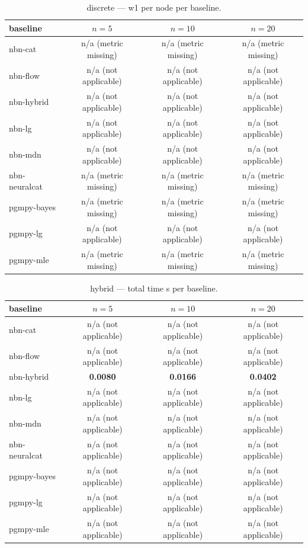 \begin{table}[h]
\centering
\caption{discrete — w1 per node per baseline.}
\label{tab:discrete_w1_per_node}
\begin{tabular}{lccc}
\toprule
baseline & $n=5$ & $n=10$ & $n=20$ \\
\midrule
nbn-cat & n/a (metric missing) & n/a (metric missing) & n/a (metric missing) \\
nbn-flow & n/a (not applicable) & n/a (not applicable) & n/a (not applicable) \\
nbn-hybrid & n/a (not applicable) & n/a (not applicable) & n/a (not applicable) \\
nbn-lg & n/a (not applicable) & n/a (not applicable) & n/a (not applicable) \\
nbn-mdn & n/a (not applicable) & n/a (not applicable) & n/a (not applicable) \\
nbn-neuralcat & n/a (metric missing) & n/a (metric missing) & n/a (metric missing) \\
pgmpy-bayes & n/a (metric missing) & n/a (metric missing) & n/a (metric missing) \\
pgmpy-lg & n/a (not applicable) & n/a (not applicable) & n/a (not applicable) \\
pgmpy-mle & n/a (metric missing) & n/a (metric missing) & n/a (metric missing) \\
\bottomrule
\end{tabular}
\end{table}

\begin{table}[h]
\centering
\caption{hybrid — total time s per baseline.}
\label{tab:hybrid_total_time_s}
\begin{tabular}{lccc}
\toprule
baseline & $n=5$ & $n=10$ & $n=20$ \\
\midrule
nbn-cat & n/a (not applicable) & n/a (not applicable) & n/a (not applicable) \\
nbn-flow & n/a (not applicable) & n/a (not applicable) & n/a (not applicable) \\
nbn-hybrid & \textbf{0.0080} & \textbf{0.0166} & \textbf{0.0402} \\
nbn-lg & n/a (not applicable) & n/a (not applicable) & n/a (not applicable) \\
nbn-mdn & n/a (not applicable) & n/a (not applicable) & n/a (not applicable) \\
nbn-neuralcat & n/a (not applicable) & n/a (not applicable) & n/a (not applicable) \\
pgmpy-bayes & n/a (not applicable) & n/a (not applicable) & n/a (not applicable) \\
pgmpy-lg & n/a (not applicable) & n/a (not applicable) & n/a (not applicable) \\
pgmpy-mle & n/a (not applicable) & n/a (not applicable) & n/a (not applicable) \\
\bottomrule
\end{tabular}
\end{table}

